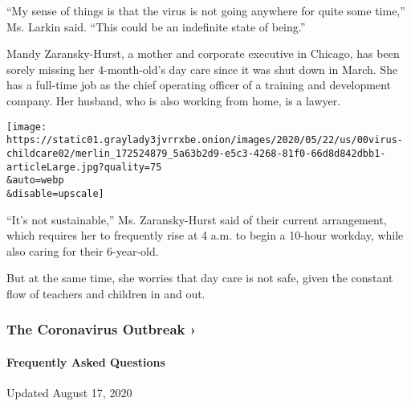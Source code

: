 ``My sense of things is that the virus is not going anywhere for quite
some time,'' Ms. Larkin said. ``This could be an indefinite state of
being.''

Mandy Zaransky-Hurst, a mother and corporate executive in Chicago, has
been sorely missing her 4-month-old's day care since it was shut down in
March. She has a full-time job as the chief operating officer of a
training and development company. Her husband, who is also working from
home, is a lawyer.

\texttt{[image: https://static01.graylady3jvrrxbe.onion/images/2020/05/22/us/00virus-childcare02/merlin\_172524879\_5a63b2d9-e5c3-4268-81f0-66d8d842dbb1-articleLarge.jpg?quality=75\\\&auto=webp\\\&disable=upscale]}

``It's not sustainable,'' Ms. Zaransky-Hurst said of their current
arrangement, which requires her to frequently rise at 4 a.m. to begin a
10-hour workday, while also caring for their 6-year-old.

But at the same time, she worries that day care is not safe, given the
constant flow of teachers and children in and out.

\href{https://www.nytimes3xbfgragh.onion/news-event/coronavirus?action=click\&pgtype=Article\&state=default\&region=MAIN_CONTENT_3\&context=storylines_faq}{}

\hypertarget{the-coronavirus-outbreak-}{%
\subsubsection{The Coronavirus Outbreak
›}\label{the-coronavirus-outbreak-}}

\hypertarget{frequently-asked-questions}{%
\paragraph{Frequently Asked
Questions}\label{frequently-asked-questions}}

Updated August 17, 2020

